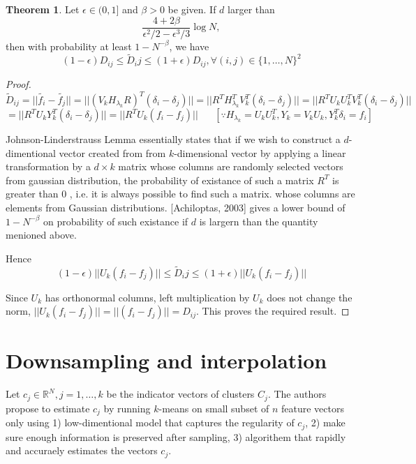 \documentclass[10pt,a4paper,twoside]{report}
\theoremstyle{definition}
\newtheorem{theorem}{Theorem}
\newcommand{\norm}[1]{\lvert\lvert {#1} \rvert\rvert}
\begin{document}
	\begin{theorem}
		Let $\epsilon \in (0,1]$ and $\beta > 0$ be given. If $d$ larger than $$\frac{4+2\beta}{\epsilon^2/2 - \epsilon^3/3}\log N,$$ then with probability at least $1-N^{-\beta}$, we have $$(1-\epsilon)D_{ij} \le \tilde{D}_ij \le (1+\epsilon)D_{ij}, \forall (i,j) \in \{1,\dots,N\}^2 $$
	\end{theorem}
	\begin{proof}
		$$ \tilde{D}_{ij} = \norm{\tilde{f_i} - \tilde{f_j}} = \norm{(V_kH_{\lambda_k}R)^T(\delta_i-\delta_j)} = \norm{R^TH_{\lambda_k}^T V_k^T(\delta_i-\delta_j)} = \norm{R^T U_k U_k^T V_k^T(\delta_i-\delta_j)} $$ 
		$$ = \norm{R^T U_k Y_k^T(\delta_i-\delta_j)} = \norm{R^T U_k (f_i-f_j)} \hspace{20pt}[\because H_{\lambda_k}=U_k U_k^T, Y_k = V_k U_k, Y_k^T \delta_i = f_i ]$$

		Johnson-Linderstrauss Lemma essentially states that if we wish to construct a $d$-dimentional vector created from from $k$-dimensional vector by applying a linear transformation by a $d \times k$ matrix whose columns are randomly selected vectors from gaussian distribution, the probability of existance of such a matrix $R^T$ is greater than $0$ , i.e. it is always possible to find such a matrix. whose columns are elements from Gaussian distributions. [Achiloptas, 2003] gives a lower bound of $1-N^{-\beta}$ on probability of such existance if $d$ is largern than the quantity menioned above. 
		
		Hence  $$(1-\epsilon)\norm{U_k (f_i-f_j)} \le \tilde{D}_ij \le (1+\epsilon)\norm{ U_k (f_i-f_j)} $$

		Since $U_k$ has orthonormal columns, left multiplication by $U_k$ does not change the norm, $\norm{U_k (f_i-f_j)} = \norm{(f_i-f_j)} = D_{ij}$. This proves the required result. 
	\end{proof}

	\section{Downsampling and interpolation}
	Let $c_j \in \mathbb{R}^N, j=1,\dots,k$ be the indicator vectors of clusters $C_j$. The authors propose to estimate $c_j$ by running $k$-means on small subset of $n$ feature vectors only using 1) low-dimentional model that captures the regularity of $c_j$, 2) make sure enough information is preserved after sampling, 3) algorithem that rapidly and accuraely estimates the vectors $c_j$. 
\end{document}

